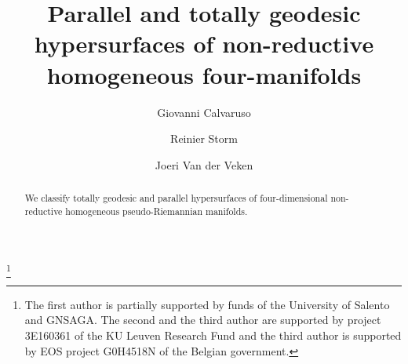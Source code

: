 \documentclass{amsart}
\theoremstyle{plain}
\theoremstyle{remark}
\begin{document}
\title[] {Parallel and totally geodesic hypersurfaces of non-reductive homogeneous four-manifolds}

\author[G.~Calvaruso]{Giovanni Calvaruso}
\address{Universit\`a del Salento\\ Dipartimento di Matematica ``E.~De Giorgi''\\  Provinciale Lecce--Arnesano\\ 73100 Lecce\\ Italy} 

\author[R. Storm]{Reinier Storm}
\address{KU Leuven\\ Department of Mathematics\\ Celestijnenlaan 200B -- Box 2400\\ BE-3001 Leuven\\ Belgium} 

\author[J. Van der Veken]{Joeri Van der Veken}
\address{KU Leuven\\ Department of Mathematics\\ Celestijnenlaan 200B -- Box 2400\\ BE-3001 Leuven\\ Belgium} 

\thanks{The first author is partially supported by funds of the University of Salento and GNSAGA. The second and the third author are supported by project 3E160361 of the KU Leuven Research Fund and the third author is supported by EOS project G0H4518N of the Belgian government.}

\begin{abstract} 
We classify totally geodesic and parallel hypersurfaces of four-dimensional non-reductive homogeneous pseudo-Riemannian manifolds.
\end{abstract}



\maketitle



\end{document}
